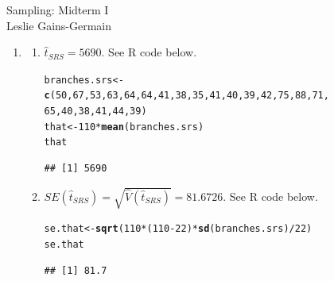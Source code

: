 \documentclass[12pt]{article}\usepackage[]{graphicx}\usepackage[]{color}
\makeatletter
\newcommand{\hlnum}[1]{\textcolor[rgb]{0.686,0.059,0.569}{#1}}%
\newcommand{\hlopt}[1]{\textcolor[rgb]{0,0,0}{#1}}%
\newcommand{\hlstd}[1]{\textcolor[rgb]{0.345,0.345,0.345}{#1}}%
\newcommand{\hlkwb}[1]{\textcolor[rgb]{0.69,0.353,0.396}{#1}}%
\newcommand{\hlkwd}[1]{\textcolor[rgb]{0.737,0.353,0.396}{\textbf{#1}}}%
\newenvironment{kframe}{%
 \def\at@end@of@kframe{}%
 \ifinner\ifhmode%
  \def\at@end@of@kframe{\end{minipage}}%
  \begin{minipage}{\columnwidth}%
 \fi\fi%
 \def\FrameCommand##1{\hskip\@totalleftmargin \hskip-\fboxsep
 \colorbox{shadecolor}{##1}\hskip-\fboxsep
     \hskip-\linewidth \hskip-\@totalleftmargin \hskip\columnwidth}%
 \MakeFramed {\advance\hsize-\width
   \@totalleftmargin\z@ \linewidth\hsize
   \@setminipage}}%
 {\par\unskip\endMakeFramed%
 \at@end@of@kframe}
\newenvironment{knitrout}{}{} %
\makeatother
\begin{document}
  
  
  \begin{center}
\large{Sampling: Midterm I} \\
Leslie Gains-Germain
\end{center}

\begin{doublespacing}

\begin{enumerate}

\item \begin{enumerate}

\item $\hat{t}_{SRS} = 5690$. See R code below.

\begin{knitrout}\footnotesize
{}\color{fgcolor}\begin{kframe}
\begin{alltt}
\hlstd{branches.srs} \hlkwb{<-} \hlkwd{c}\hlstd{(}\hlnum{50}\hlstd{,} \hlnum{67}\hlstd{,} \hlnum{53}\hlstd{,} \hlnum{63}\hlstd{,} \hlnum{64}\hlstd{,} \hlnum{64}\hlstd{,} \hlnum{41}\hlstd{,} \hlnum{38}\hlstd{,} \hlnum{35}\hlstd{,} \hlnum{41}\hlstd{,} \hlnum{40}\hlstd{,} \hlnum{39}\hlstd{,} \hlnum{42}\hlstd{,} \hlnum{75}\hlstd{,} \hlnum{88}\hlstd{,} \hlnum{71}\hlstd{,}
                  \hlnum{65}\hlstd{,} \hlnum{40}\hlstd{,} \hlnum{38}\hlstd{,} \hlnum{41}\hlstd{,} \hlnum{44}\hlstd{,} \hlnum{39}\hlstd{)}
\hlstd{that} \hlkwb{<-} \hlnum{110}\hlopt{*}\hlkwd{mean}\hlstd{(branches.srs)}
\hlstd{that}
\end{alltt}
\begin{verbatim}
## [1] 5690
\end{verbatim}
\end{kframe}
\end{knitrout}

\item $SE(\hat{t}_{SRS}) = \sqrt{\hat{V}(\hat{t}_{SRS})} = 81.6726$. See R code below.

\begin{knitrout}\footnotesize
{}\color{fgcolor}\begin{kframe}
\begin{alltt}
\hlstd{se.that} \hlkwb{<-} \hlkwd{sqrt}\hlstd{(}\hlnum{110} \hlopt{*} \hlstd{(}\hlnum{110}\hlopt{-}\hlnum{22}\hlstd{)} \hlopt{*} \hlkwd{sd}\hlstd{(branches.srs)} \hlopt{/} \hlnum{22}\hlstd{)}
\hlstd{se.that}
\end{alltt}
\begin{verbatim}
## [1] 81.7
\end{verbatim}
\end{kframe}
\end{knitrout}


\end{enumerate}
\end{enumerate}
\end{doublespacing}
\end{document}
